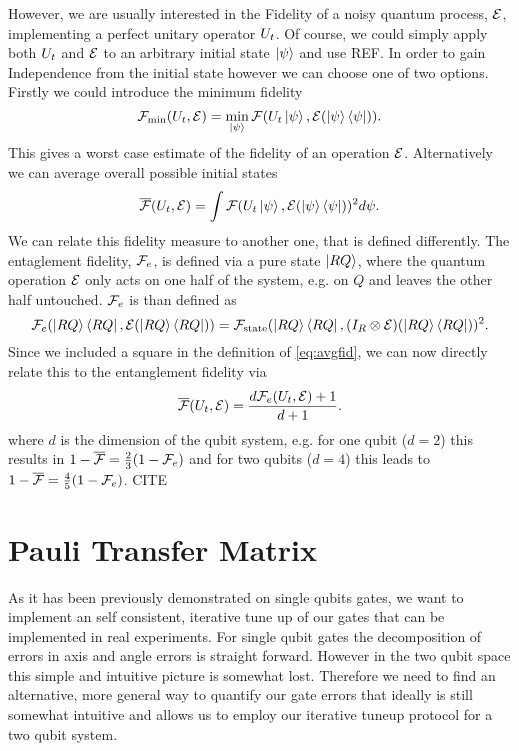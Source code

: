 However, we are usually interested in the Fidelity of a noisy quantum process, $\mathcal{E}$, implementing a perfect unitary operator $U_t$. Of course, we could simply apply both $U_t$ and $\mathcal{E}$ to an arbitrary initial state $\ket{\psi}$ and use REF. In order to gain Independence from the initial state however we can choose one of two options. Firstly we could introduce the minimum fidelity
\begin{equation}
\mathcal{F}_\text{min}(U_t,\mathcal{E})=\min_{\Ket{\psi}} \mathcal{F}(U_t \Ket{\psi}, \mathcal{E}(\Ket{\psi} \bra{\psi})).
\end{equation}
This gives a worst case estimate of the fidelity of an operation $\mathcal{E}$.
Alternatively we can average overall possible initial states
\begin{equation}
\overline{\mathcal{F}}(U_t,\mathcal{E})=\int \mathcal{F}(U_t \Ket{\psi}, \mathcal{E}(\Ket{\psi} \bra{\psi}))^2 d\psi.
\label{eq:avgfid}
\end{equation}
We can relate this fidelity measure to another one, that is defined differently.
The entaglement fidelity, $\mathcal{F}_e$, is defined via a pure state $\ket{RQ}$, where the quantum operation $\mathcal{E}$ only acts on one half of the system, e.g. on $Q$ and leaves the other half untouched. $\mathcal{F}_e$ is than defined as
\begin{equation}
\mathcal{F}_e(\ket{RQ} \bra{RQ},\mathcal{E}(\ket{RQ} \bra{RQ}))=\mathcal{F}_\text{state}(\ket{RQ} \bra{RQ},(I_R \otimes \mathcal{E})(\ket{RQ} \bra{RQ}))^2.
\end{equation}
Since we included a square in the definition of \ref{eq:avgfid}, we can now directly relate this to the entanglement fidelity via
\begin{equation}
\overline{\mathcal{F}}(U_t,\mathcal{E})=\frac{d\mathcal{F}_e(U_t,\mathcal{E})+1}{d+1}.
\end{equation}
where $d$ is the dimension of the qubit system, e.g. for one qubit ($d=2$) this results in $1-\overline{\mathcal{F}}=\frac{2}{3}(1-\mathcal{F}_e)$ and for two qubits ($d=4$) this leads to $1-\overline{\mathcal{F}}=\frac{4}{5}(1-\mathcal{F}_e)$.
CITE

\section{Pauli Transfer Matrix}
As it has been previously demonstrated on single qubits gates, we want to implement an self consistent, iterative tune up of our gates that can be implemented in real experiments. For single qubit gates the decomposition of errors in axis and angle errors is straight forward. However in the two qubit space this simple and intuitive picture is somewhat lost. Therefore we need to find an alternative, more general way to quantify our gate errors that ideally is still somewhat intuitive and allows us to employ our iterative tuneup protocol for a two qubit system.

